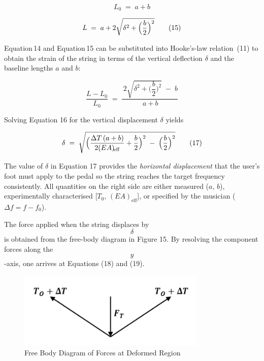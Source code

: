 \documentclass[12pt]{article}
\theoremstyle{definition} %
\theoremstyle{plain} %
\begin{document}

\begin{equation}
  L_0 \;=\; a + b
  \tag{14}
\end{equation}

\begin{equation}
  L \;=\; a + 2\sqrt{\delta^{2} + \Bigl(\dfrac{b}{2}\Bigr)^{2}}
  \tag{15}
\end{equation}

Equation\,14 and Equation\,15 can be substituted into Hooke’s-law
relation~(11) to obtain the strain of the string in terms of the vertical
deflection $\delta$ and the baseline lengths $a$ and $b$:

\begin{equation}
  \frac{L - L_0}{L_0}
    \;=\;
  \frac{\,2\sqrt{\delta^{2} + \bigl(\dfrac{b}{2}\bigr)^{2}}\; -\; b}{\,a + b}
  \tag{16}
\end{equation}

Solving Equation 16 for the vertical displacement $\delta$ yields

\begin{equation}
  \delta
    \;=\;
  \sqrt{
    \Bigl(
      \frac{\Delta T\,(a+b)}{2(EA)_{\!\mathrm{eff}}}
      + \frac{b}{2}
    \Bigr)^{2}
    \;-\;
    \Bigl(\frac{b}{2}\Bigr)^{2}}
  \tag{17}
\end{equation}

The value of $\delta$ in Equation 17 provides the \emph{horizontal
displacement} that the user’s foot must apply to the pedal so the string
reaches the target frequency consistently.  All quantities on the right
side are either measured ($a$, $b$), experimentally characterised
[$T_0$, $(EA)_{\!\text{eff}}$], or specified by the musician
($\Delta f = f - f_0$).

The force applied when the string displaces by $$\delta$$ is obtained
from the free-body diagram in Figure 15.  
By resolving the component forces along the $$y$$-axis, one arrives at
Equations (18) and (19).

\begin{figure}[htbp]
  \centering
  \includegraphics[width=0.8\textwidth]{classes/Mathematics-of-Guitar-Strings/06-10/fgs/fig15.png}
  \caption{Free Body Diagram of Forces at Deformed Region}
  \label{fig:}
\end{figure}
\end{document}
